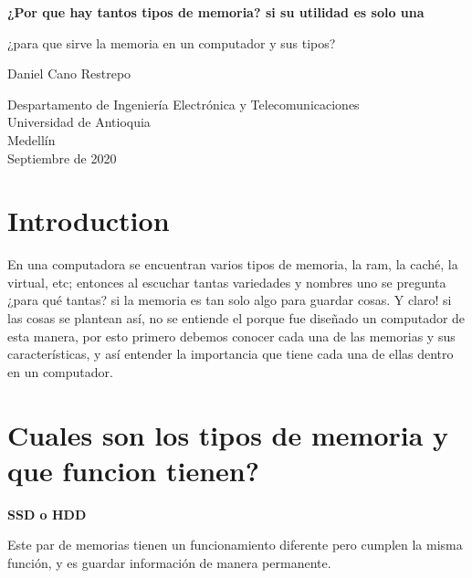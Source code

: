 \documentclass{article}
\begin{document}
\begin{titlepage}
    \begin{center}
        
        \huge
        \textbf{¿Por que hay tantos tipos de memoria? si su utilidad es solo una}
        \large 
        
        \vspace{1cm}
        ¿para que sirve la memoria en un computador y sus tipos?
        \vspace{4cm}
        
        Daniel Cano Restrepo
        
        \vspace{7.5cm}
        
        \small
        Despartamento de Ingeniería Electrónica y Telecomunicaciones\\
        Universidad de Antioquia\\
        Medellín\\
        Septiembre de 2020
        
    \end{center}
\end{titlepage}

\tableofcontents




\section{Introduction}
\vspace{1cm}
En una computadora se encuentran varios tipos de memoria, la ram, la caché, la virtual, etc; entonces al escuchar tantas variedades y nombres uno se pregunta ¿para qué tantas? si la memoria es tan solo algo para guardar cosas. Y claro! si las cosas se plantean así, no se entiende el porque fue diseñado un computador de esta manera, por esto primero debemos conocer cada una de las memorias y sus características, y así entender la importancia que tiene cada una de ellas dentro en un computador.


\section{Cuales son los tipos de memoria y que funcion tienen?}
\vspace{1cm}
\begin{center}
    \textbf{SSD o HDD}
\end{center}

Este par de memorias tienen un funcionamiento diferente pero cumplen la misma función, y es guardar información de manera permanente.
\vspace{0.4cm}
\end{document}
